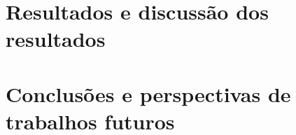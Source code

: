 \documentclass[12pt,a4paper]{article}
\begin{document}
\section{Resultados e discussão dos resultados}

\section{Conclusões e perspectivas de trabalhos futuros}
\end{document}
